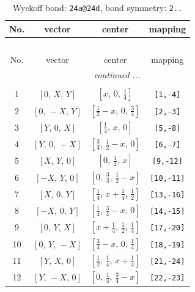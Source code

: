 \documentclass[fleqn,8pt]{jsarticle}
\begin{document}
\begin{longtable}{cccc}
\caption{Wyckoff bond: {\tt 24a@24d}, bond symmetry: {\tt 2..}}
 \\
 \hline \hline
No. & vector & center & mapping \\ \hline \endfirsthead

\multicolumn{3}{l}{\tablename\ \thetable{}} \\
 \hline \hline
No. & vector & center & mapping \\ \hline \endhead

 \hline \hline
\multicolumn{3}{r}{\footnotesize\it continued ...} \\ \endfoot

 \hline \hline
\multicolumn{3}{r}{} \\ \endlastfoot

1 & $\left[ 0,\, X,\, Y \right]$ & $\left[ x,\, 0,\, \frac{1}{4} \right]$ & {\tt [1,-4]} \\ \hline
2 & $\left[ 0,\, - X,\, Y \right]$ & $\left[ \frac{1}{2} - x,\, 0,\, \frac{3}{4} \right]$ & {\tt [2,-3]} \\ \hline
3 & $\left[ Y,\, 0,\, X \right]$ & $\left[ \frac{1}{4},\, x,\, 0 \right]$ & {\tt [5,-8]} \\ \hline
4 & $\left[ Y,\, 0,\, - X \right]$ & $\left[ \frac{3}{4},\, \frac{1}{2} - x,\, 0 \right]$ & {\tt [6,-7]} \\ \hline
5 & $\left[ X,\, Y,\, 0 \right]$ & $\left[ 0,\, \frac{1}{4},\, x \right]$ & {\tt [9,-12]} \\ \hline
6 & $\left[ - X,\, Y,\, 0 \right]$ & $\left[ 0,\, \frac{3}{4},\, \frac{1}{2} - x \right]$ & {\tt [10,-11]} \\ \hline
7 & $\left[ X,\, 0,\, Y \right]$ & $\left[ \frac{1}{4},\, x + \frac{1}{4},\, \frac{1}{2} \right]$ & {\tt [13,-16]} \\ \hline
8 & $\left[ - X,\, 0,\, Y \right]$ & $\left[ \frac{1}{4},\, \frac{3}{4} - x,\, 0 \right]$ & {\tt [14,-15]} \\ \hline
9 & $\left[ 0,\, Y,\, X \right]$ & $\left[ x + \frac{1}{4},\, \frac{1}{2},\, \frac{1}{4} \right]$ & {\tt [17,-20]} \\ \hline
10 & $\left[ 0,\, Y,\, - X \right]$ & $\left[ \frac{3}{4} - x,\, 0,\, \frac{1}{4} \right]$ & {\tt [18,-19]} \\ \hline
11 & $\left[ Y,\, X,\, 0 \right]$ & $\left[ \frac{1}{2},\, \frac{1}{4},\, x + \frac{1}{4} \right]$ & {\tt [21,-24]} \\ \hline
12 & $\left[ Y,\, - X,\, 0 \right]$ & $\left[ 0,\, \frac{1}{4},\, \frac{3}{4} - x \right]$ & {\tt [22,-23]} \\
\end{longtable}
\end{document}
